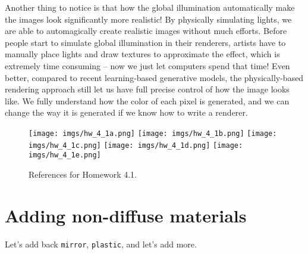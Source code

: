 Another thing to notice is that how the global illumination automatically make the images look significantly more realistic! By physically simulating lights, we are able to automagically create realistic images without much efforts. Before people start to simulate global illumination in their renderers, artists have to manually place lights and draw textures to approximate the effect, which is extremely time consuming -- now we just let computers spend that time! Even better, compared to recent learning-based generative models, the physically-based rendering approach still let us have full precise control of how the image looks like. We fully understand how the color of each pixel is generated, and we can change the way it is generated if we know how to write a renderer.

\begin{figure}[ht]
    \centering
    \texttt{[image: imgs/hw\_4\_1a.png]}
    \texttt{[image: imgs/hw\_4\_1b.png]}
    \texttt{[image: imgs/hw\_4\_1c.png]}
    \texttt{[image: imgs/hw\_4\_1d.png]}
    \texttt{[image: imgs/hw\_4\_1e.png]}
    \caption{References for Homework 4.1.}
    \label{fig:hw_4_1}
\end{figure}

\section{Adding non-diffuse materials}
Let's add back \lstinline{mirror}, \lstinline{plastic}, and let's add more. 

